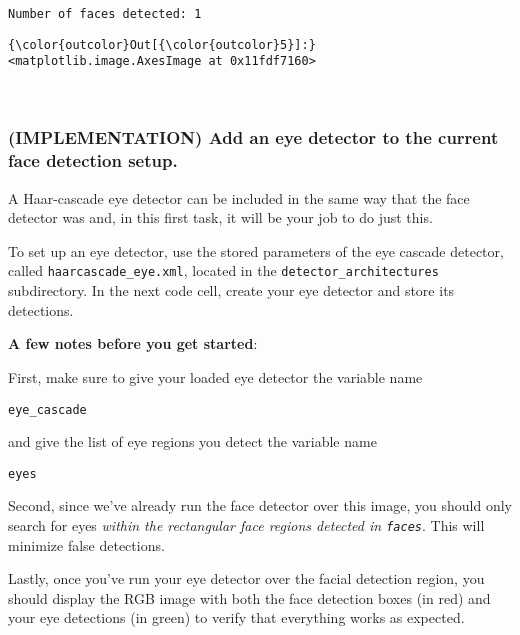 \documentclass[11pt]{article}
\begin{document}
    \begin{Verbatim}[commandchars=\\\{\}]
Number of faces detected: 1

    \end{Verbatim}

\begin{Verbatim}[commandchars=\\\{\}]
{\color{outcolor}Out[{\color{outcolor}5}]:} <matplotlib.image.AxesImage at 0x11fdf7160>
\end{Verbatim}
            
    \begin{center}
    \end{center}
    { \hspace*{\fill} \\}
    
    \hypertarget{implementation-add-an-eye-detector-to-the-current-face-detection-setup.}{%
\subsubsection{(IMPLEMENTATION) Add an eye detector to the current face
detection
setup.}\label{implementation-add-an-eye-detector-to-the-current-face-detection-setup.}}

A Haar-cascade eye detector can be included in the same way that the
face detector was and, in this first task, it will be your job to do
just this.

    To set up an eye detector, use the stored parameters of the eye cascade
detector, called \texttt{haarcascade\_eye.xml}, located in the
\texttt{detector\_architectures} subdirectory. In the next code cell,
create your eye detector and store its detections.

\textbf{A few notes before you get started}:

First, make sure to give your loaded eye detector the variable name

\texttt{eye\_cascade}

and give the list of eye regions you detect the variable name

\texttt{eyes}

Second, since we've already run the face detector over this image, you
should only search for eyes \emph{within the rectangular face regions
detected in \texttt{faces}}. This will minimize false detections.

Lastly, once you've run your eye detector over the facial detection
region, you should display the RGB image with both the face detection
boxes (in red) and your eye detections (in green) to verify that
everything works as expected.
\end{document}

